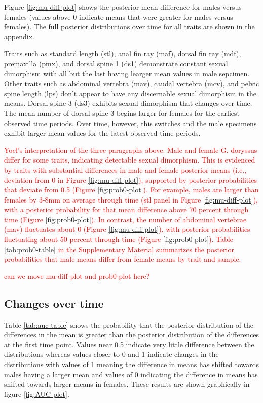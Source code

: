 \documentclass[
  12pt,
]{article}
\begin{document}
Figure \ref{fig:mu-diff-plot} shows the posterior mean difference for
males versus females (values above 0 indicate means that were greater
for males versus females). The full posterior distributions over time
for all traits are shown in the appendix.

Traits such as standard length (stl), anal fin ray (maf), dorsal fin ray
(mdf), premaxilla (pmx), and dorsal spine 1 (ds1) demonstrate constant
sexual dimorphism with all but the last having learger mean values in
male sepcimen. Other traits such as abdominal vertebra (mav), caudal
vertebra (mcv), and pelvic spine length (lps) don't appear to have any
discernable sexual dimorphism in the means. Dorsal spine 3 (ds3)
exhibits sexual dimorphism that changes over time. The mean number of
dorsal spine 3 begins larger for females for the earliest observed time
periods. Over time, however, this switches and the male specimens
exhibit larger mean values for the latest observed time periods.

\textcolor{red} {
Yoel's interpretation of the three paragraphs above. Male and female G. doryssus differ for some traits, indicating detectable sexual dimorphism. This is evidenced by traits with substantial differences in male and female posterior means (i.e., deviation from 0 in Figure \ref{fig:mu-diff-plot}), supported by posterior probabilities that deviate from 0.5 (Figure \ref{fig:prob0-plot}). For example, males are larger than females by 3-8mm on average through time (stl panel in Figure \ref{fig:mu-diff-plot}), with a posterior probability for that mean difference above 70 percent through time (Figure \ref{fig:prob0-plot}). In contrast, the number of abdominal vertebrae (mav) fluctuates about 0 (Figure \ref{fig:mu-diff-plot}), with posterior probabilities fluctuating about 50 percent through time (Figure \ref{fig:prob0-plot}). Table \ref{tab:prob0-table} in the Supplementary Material summarizes the posterior probabilities that male means differ from female means by trait and sample.
}

\textcolor{red}{can we move mu-diff-plot and prob0-plot here?}

\hypertarget{changes-over-time}{%
\subsection{Changes over time}\label{changes-over-time}}

Table \ref{tab:auc-table} shows the probability that the posterior
distribution of the differences in the mean is greater than the
posterior distribution of the differences at the first time point.
Values near 0.5 indicate very little difference between the
distributions whereas values closer to 0 and 1 indicate changes in the
distributions with values of 1 meaning the difference in means has
shifted towards males having a larger mean and values of 0 indicating
the difference in means has shifted towards larger means in females.
These results are shown graphically in figure \ref{fig:AUC-plot}.
\end{document}
